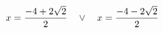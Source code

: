 \documentclass[preview]{standalone}
\begin{document}
\begin{align*}
\special{dvisvgm:raw <g id='unique000'>}x=\frac{-4 + 2 \sqrt{2}}{2} \quad \lor \quad x=\frac{-4 - 2 \sqrt{2}}{2}\special{dvisvgm:raw </g>}
\end{align*}
\end{document}
